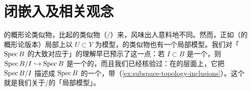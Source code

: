 
\chapter{闭嵌入及相关观念}
\label{ch:closed-embeddings}

\trClosedSubset{}的概形论类似物，比起\trOpenSet{}的类似物（\trOpenSubscheme/\trOpenEmbedding）来，风味出人意料地不同。然而，正如\trOpenSubscheme（\trOpenSet{}的概形论版本）局部上以\trOpenSet{} $U\subset Y$ 为模型，\trClosedSubset{}的类似物也有一个局部模型。我们对「$\operatorname{Spec} B$ 的\trClosedSubset{}大致对应于\trIdeal」的理解早已预示了这一点：若 $I\subset B$ 是一个\trIdeal，则 $\operatorname{Spec} B/I\hookrightarrow\operatorname{Spec} B$ 是一个\trScheme{}的\trMorphism，而且我们已经核验过：在\trTopologicalSpace{}的层面上，它把 $\operatorname{Spec} B/I$ 描述成 $\operatorname{Spec} B$ 的一个\trClosedSubset，带\trSubspaceTopology（\cref{ex:subspace-topology-inclusions}）。这个\trMorphism{}就是我们关于\trClosedSubscheme/\trClosedEmbedding{}的「局部模型」。






